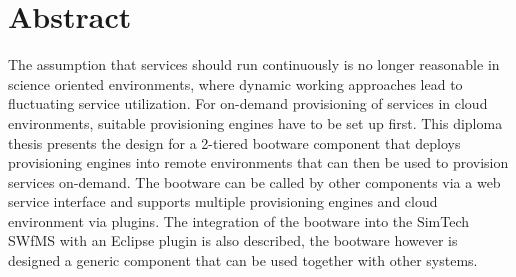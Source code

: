 \chapter*{Abstract}

The assumption that services should run continuously is no longer reasonable in science oriented environments, where dynamic working approaches lead to fluctuating service utilization.
For on-demand provisioning of services in cloud environments, suitable provisioning engines have to be set up first.
This diploma thesis presents the design for a 2-tiered bootware component that deploys provisioning engines into remote environments that can then be used to provision services on-demand.
The bootware can be called by other components via a web service interface and supports multiple provisioning engines and cloud environment via plugins.
The integration of the bootware into the SimTech SWfMS with an Eclipse plugin is also described, the bootware however is designed a generic component that can be used together with other systems.
